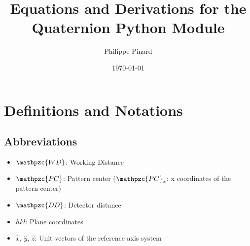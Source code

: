 \documentclass[letterpaper]{article}
\title{Equations and Derivations for the Quaternion Python Module}
\author{Philippe Pinard}
\date{\today}
\newcommand{\vx}{\hat{x}}
\newcommand{\vy}{\hat{y}}
\newcommand{\vz}{\hat{z}}
\newcommand{\var}[1]{\mathpzc{#1}}
\begin{document}
	\pagestyle{fancy}
	\fancyhf{}
	\setlength{\headheight}{15pt}
	\setlength{\headsep}{10pt}
	\rhead{\today}
	\rfoot{\thepage}
	
	\section{Definitions and Notations}
	\subsection{Abbreviations}
		\begin{itemize}
			\item $\var{WD}$: Working Distance
			\item $\var{PC}$: Pattern center ($\var{PC}_x$: x coordinates of the pattern center)
			\item $\var{DD}$: Detector distance
			\item $hkl$: Plane coordinates
			\item $\vx$, $\vy$, $\vz$: Unit vectors of the reference axis system
		\end{itemize}
\end{document}
